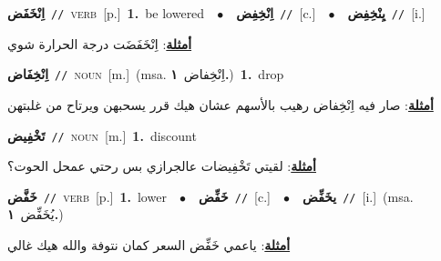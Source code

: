 \documentclass[10pt,a4paper,twoside]{article} %
\begin{document}
\begin{multicols}{2}
{\setlength\topsep{0pt}\textbf{\foreignlanguage{arabic}{اِنْخَفَض}}\ {\color{gray}\texttt{//}\color{black}}\ \textsc{verb}\ [p.]\ \textbf{1.}~be lowered\ \ $\bullet$\ \ \setlength\topsep{0pt}\textbf{\foreignlanguage{arabic}{اِنْخِفِض}}\ {\color{gray}\texttt{//}\color{black}}\ [c.]\ \ $\bullet$\ \ \setlength\topsep{0pt}\textbf{\foreignlanguage{arabic}{يِنْخِفِض}}\ {\color{gray}\texttt{//}\color{black}}\ [i.]\  \begin{flushright}\color{gray}\foreignlanguage{arabic}{\textbf{\underline{\foreignlanguage{arabic}{أمثلة}}}: اِنْخَفَضَت درجة الحرارة شوي}\end{flushright}\color{black}} \vspace{2mm}

{\setlength\topsep{0pt}\textbf{\foreignlanguage{arabic}{اِنْخِفَاض}}\ {\color{gray}\texttt{//}\color{black}}\ \textsc{noun}\ [m.]\ \color{gray}(msa. \foreignlanguage{arabic}{اِنْخِفاض}~\foreignlanguage{arabic}{\textbf{١.}})\color{black}\ \textbf{1.}~drop\  \begin{flushright}\color{gray}\foreignlanguage{arabic}{\textbf{\underline{\foreignlanguage{arabic}{أمثلة}}}: صار فيه اِنْخِفاض رهيب بالأسهم عشان هيك قرر يسحبهن ويرتاح من غلبتهن}\end{flushright}\color{black}} \vspace{2mm}

{\setlength\topsep{0pt}\textbf{\foreignlanguage{arabic}{تَخْفِيض}}\ {\color{gray}\texttt{//}\color{black}}\ \textsc{noun}\ [m.]\ \textbf{1.}~discount\  \begin{flushright}\color{gray}\foreignlanguage{arabic}{\textbf{\underline{\foreignlanguage{arabic}{أمثلة}}}: لقيتي تَخْفِيضات عالجرازي بس رحتي عمحل الحوت؟}\end{flushright}\color{black}} \vspace{2mm}

{\setlength\topsep{0pt}\textbf{\foreignlanguage{arabic}{خَفَّض}}\ {\color{gray}\texttt{//}\color{black}}\ \textsc{verb}\ [p.]\ \textbf{1.}~lower\ \ $\bullet$\ \ \setlength\topsep{0pt}\textbf{\foreignlanguage{arabic}{خَفِّض}}\ {\color{gray}\texttt{//}\color{black}}\ [c.]\ \ $\bullet$\ \ \setlength\topsep{0pt}\textbf{\foreignlanguage{arabic}{يخَفِّض}}\ {\color{gray}\texttt{//}\color{black}}\ [i.]\ \color{gray}(msa. \foreignlanguage{arabic}{يُخَفِّض}~\foreignlanguage{arabic}{\textbf{١.}})\color{black}\  \begin{flushright}\color{gray}\foreignlanguage{arabic}{\textbf{\underline{\foreignlanguage{arabic}{أمثلة}}}: ياعمي خَفِّض السعر كمان نتوفة والله هيك غالي}\end{flushright}\color{black}} \vspace{2mm}


\end{multicols}
\end{document}
